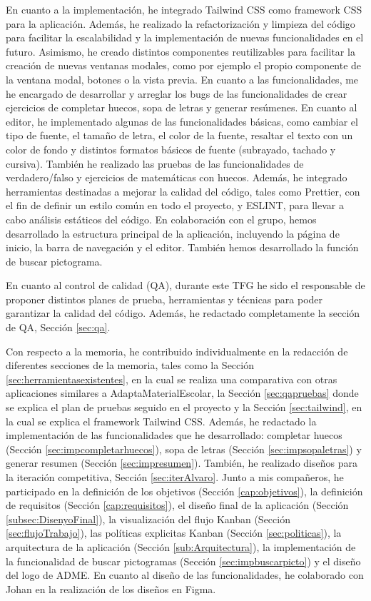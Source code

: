 En cuanto a la implementación, he integrado Tailwind CSS como framework CSS para la aplicación. Además, he realizado la refactorización y limpieza del código para facilitar la escalabilidad y la implementación de nuevas funcionalidades en el futuro. Asimismo, he creado distintos componentes reutilizables para facilitar la creación de nuevas ventanas modales, como por ejemplo el propio componente de la ventana modal, botones o la vista previa. En cuanto a las funcionalidades, me he encargado de desarrollar y arreglar los bugs de las funcionalidades de crear ejercicios de completar huecos, sopa de letras y generar resúmenes. En cuanto al editor, he implementado algunas de las funcionalidades básicas, como cambiar el tipo de fuente, el tamaño de letra, el color de la fuente, resaltar el texto con un color de fondo y distintos formatos básicos de fuente (subrayado, tachado y cursiva). También he realizado las pruebas de las funcionalidades de verdadero/falso y ejercicios de matemáticas con huecos. Además, he integrado herramientas destinadas a mejorar la calidad del código, tales como Prettier, con el fin de definir un estilo común en todo el proyecto, y ESLINT, para llevar a cabo análisis estáticos del código. En colaboración con el grupo, hemos desarrollado la estructura principal de la aplicación, incluyendo la página de inicio, la barra de navegación y el editor. También hemos desarrollado la función de buscar pictograma.

En cuanto al control de calidad (QA), durante este TFG he sido el responsable de proponer distintos planes de prueba, herramientas y técnicas para poder garantizar la calidad del código. Además, he redactado completamente la sección de QA, Sección \ref{sec:qa}.

Con respecto a la memoria, he contribuido individualmente en la redacción de diferentes secciones de la memoria, tales como la Sección \ref{sec:herramientasexistentes}, en la cual se realiza una comparativa con otras aplicaciones similares a AdaptaMaterialEscolar, la Sección \ref{sec:qapruebas} donde se explica el plan de pruebas seguido en el proyecto y la Sección \ref{sec:tailwind}, en la cual se explica el framework Tailwind CSS. Además, he redactado la implementación de las funcionalidades que he desarrollado: completar huecos (Sección \ref{sec:impcompletarhuecos}), sopa de letras (Sección \ref{sec:impsopaletras}) y generar resumen (Sección \ref{sec:impresumen}). También, he realizado diseños para la iteración competitiva, Sección \ref{sec:iterAlvaro}. Junto a mis compañeros, he participado en la definición de los objetivos (Sección \ref{cap:objetivos}), la definición de requisitos (Sección \ref{cap:requisitos}), el diseño final de la aplicación (Sección \ref{subsec:DisenyoFinal}), la visualización del flujo Kanban (Sección \ref{sec:flujoTrabajo}), las políticas explicitas Kanban (Sección \ref{sec:politicas}), la arquitectura de la aplicación (Sección \ref{sub:Arquitectura}), la implementación de la funcionalidad de buscar pictogramas (Sección \ref{sec:impbuscarpicto}) y el diseño del logo de ADME. En cuanto al diseño de las funcionalidades, he colaborado con Johan en la realización de los diseños en Figma.

